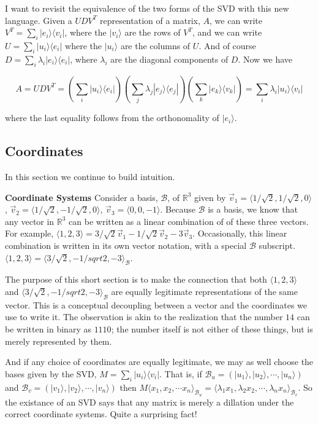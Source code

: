 \documentclass{amsbook}
\begin{document}
I want to revisit the equivalence of the two forms of the SVD with this new language.  Given a $UDV^T$ representation of a matrix, $A$, we can write $V^T=\sum_i|e_i\rangle\langle v_i|$, where the $|v_i\rangle$ are the rows of $V^T$, and we can write $U=\sum_i|u_i\rangle\langle e_i|$ where the $|u_i\rangle$ are the columns of $U$.  And of course $D=\sum_i\lambda_i|e_i\rangle\langle e_i|$, where $\lambda_i$ are the diagonal components of $D$.  Now we have

$$
A=UDV^T=\left(\sum_i|u_i\rangle\langle e_i|\right)\left(\sum_j\lambda_j|e_j\rangle\langle e_j|\right)\left(\sum_k|e_k\rangle\langle v_k|\right)=\sum_i\lambda_i|u_i\rangle\langle v_i|
$$

where the last equality follows from the orthonomality of $|e_i\rangle$.

\subsection{Coordinates}\label{Coordinates}

In this section we continue to build intuition.

\begin{tcolorbox}[title=Example: Coordinate Systems,colback=blue!5]
  {\bfseries\Large Coordinate Systems}
Consider a basis, $\mathcal B$, of $\mathbb R^3$ given by $\vec v_1=\langle 1/\sqrt2, 1/\sqrt2, 0\rangle$, $\vec v_2=\langle 1/\sqrt2, -1/\sqrt2, 0\rangle$, $\vec v_3=\langle 0, 0, -1\rangle$.  Because $\mathcal B$ is a basis, we know that any vector in $\mathbb R^3$ can be written as a linear combination of of these three vectors.  For example, $\langle 1, 2, 3\rangle = 3/\sqrt2 \vec v_1-1/\sqrt2\vec v_2-3\vec v_3$.  Occasionally, this linear combination is written in its own vector notation, with a special $\mathcal B$ subscript.  $\langle 1, 2, 3\rangle=\langle 3/\sqrt2, -1/sqrt2, -3\rangle_{\mathcal B}$.
\end{tcolorbox}

The purpose of this short section is to make the connection that both $\langle 1, 2, 3\rangle$ and $\langle 3/\sqrt2, -1/sqrt2, -3\rangle_{\mathcal B}$ are equally legitimate representations of the same vector.  This is a conceptual decoupling between a vector and the coordinates we use to write it.  The observation is akin to the realization that the number $14$ can be written in binary as $1110$; the number itself is not either of these things, but is merely represented by them.

And if any choice of coordinates are equally legitimate, we may as well choose the bases given by the SVD, $M=\sum_i|u_i\rangle\langle v_i|$.  That is, if $\mathcal B_u=(|u_1\rangle, |u_2\rangle, \cdots, |u_n\rangle)$ and $\mathcal B_v=(|v_1\rangle, |v_2\rangle, \cdots, |v_n\rangle)$ then $M\langle x_1, x_2, \cdots x_n\rangle_{\mathcal B_u}=\langle \lambda_1x_1, \lambda_2x_2, \cdots, \lambda_nx_n\rangle_{\mathcal B_v}$.  So the existance of an SVD says that any matrix is merely a dillation under the correct coordinate systems.  Quite a surprising fact!
\end{document}
